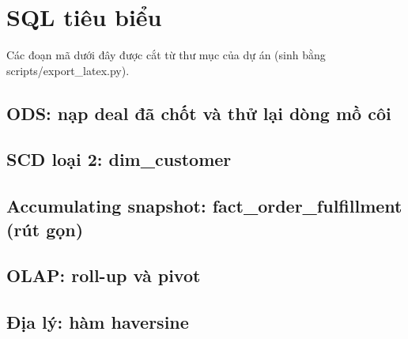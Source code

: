 \section*{SQL tiêu biểu}
Các đoạn mã dưới đây được cắt từ thư mục  của dự án (sinh bằng scripts/export\_latex.py).

\subsection*{ODS: nạp deal đã chốt và thử lại dòng mồ côi}



\subsection*{SCD loại 2: dim\_customer}


\subsection*{Accumulating snapshot: fact\_order\_fulfillment (rút gọn)}


\subsection*{OLAP: roll-up và pivot}



\subsection*{Địa lý: hàm haversine}

